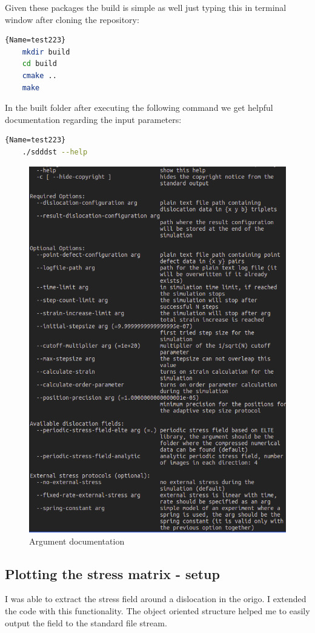 \documentclass[12pt,a4paper]{article}
\theoremstyle{plain}
\begin{document}
\begin{multicols*}{2}
	\par Given these packages the build is simple as well just typing this in terminal window
	after cloning the repository:

	\vspace{0.1cm}

	\begin{lstlisting}[language=bash]{Name=test223}
	mkdir build
	cd build
	cmake ..
	make
	\end{lstlisting}

	\par In the built folder after executing the following command we get helpful
	documentation regarding the input parameters:

	\begin{lstlisting}[language=bash]{Name=test223}
	./sdddst --help
	\end{lstlisting}

	\begin{figure}[H]
		\centering
		\includegraphics[width=0.65\columnwidth]{docs.png}
		\caption{Argument documentation}
	\end{figure}

	\subsection{Plotting the stress matrix - setup}

	\par I was able to extract the stress field around a dislocation
	in the origo. I extended the code with this functionality. The object oriented structure
	helped me to easily output the field to the standard file stream.


\end{multicols*}
\end{document}

